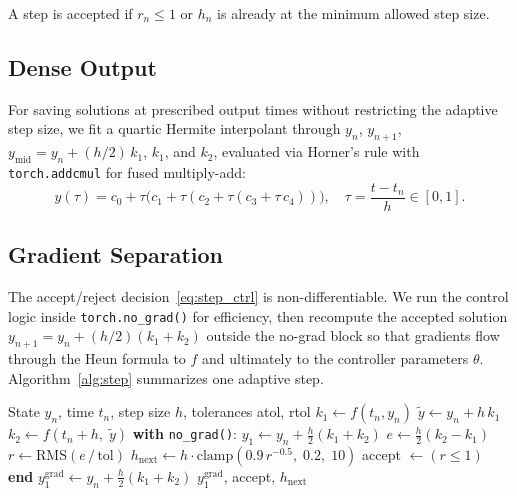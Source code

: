 \documentclass[11pt]{article}
\begin{document}
A step is accepted if $r_n \le 1$ or $h_n$ is already at the minimum
allowed step size.

\subsection{Dense Output}

For saving solutions at prescribed output times without restricting the
adaptive step size, we fit a quartic Hermite interpolant through
$y_n$, $y_{n+1}$, $y_{\text{mid}} = y_n + (h/2)\,k_1$, $k_1$, and
$k_2$, evaluated via Horner's rule with \texttt{torch.addcmul} for
fused multiply-add:
\begin{equation}
  y(\tau) = c_0 + \tau\bigl(c_1 + \tau(c_2 + \tau(c_3 + \tau\,c_4))\bigr),
  \quad \tau = \frac{t - t_n}{h} \in [0, 1].
  \label{eq:horner}
\end{equation}

\subsection{Gradient Separation}

The accept/reject decision~\eqref{eq:step_ctrl} is non-differentiable.
We run the control logic inside \texttt{torch.no\_grad()} for
efficiency, then recompute the accepted solution $y_{n+1} = y_n +
(h/2)(k_1 + k_2)$ outside the no-grad block so that gradients flow
through the Heun formula to $f$ and ultimately to the controller
parameters $\theta$.  Algorithm~\ref{alg:step} summarizes one adaptive
step.

\begin{algorithm}[t]
\caption{Corrected Adaptive Heun Step}
\label{alg:step}
\begin{algorithmic}[1]
\REQUIRE State $y_n$, time $t_n$, step size $h$, tolerances atol, rtol
\STATE $k_1 \gets f(t_n, y_n)$ 
\STATE $\tilde{y} \gets y_n + h\,k_1$ 
\STATE $k_2 \gets f(t_n + h,\; \tilde{y})$
\STATE \textbf{with} \texttt{no\_grad()}:
\STATE \quad $y_1 \gets y_n + \tfrac{h}{2}(k_1 + k_2)$
\STATE \quad $e \gets \tfrac{h}{2}(k_2 - k_1)$
\STATE \quad $r \gets \text{RMS}(e\,/\,\text{tol})$
\STATE \quad $h_{\text{next}} \gets h \cdot
              \text{clamp}(0.9\,r^{-0.5},\; 0.2,\; 10)$
\STATE \quad accept $\gets (r \le 1)$
\STATE \textbf{end}
\STATE $y_1^{\text{grad}} \gets y_n + \tfrac{h}{2}(k_1 + k_2)$
\RETURN $y_1^{\text{grad}}$, accept, $h_{\text{next}}$
\end{algorithmic}
\end{algorithm}
\end{document}
